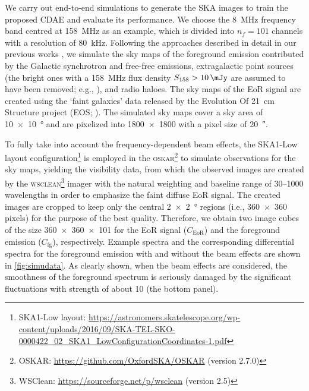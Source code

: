 \documentclass[fleqn,usenatbib]{mnras}
\newcommand{\R}[1]{\mathrm{#1}}
\begin{document}
We carry out end-to-end simulations to generate the SKA images to
train the proposed CDAE and evaluate its performance.
We choose the \SI{8}{\MHz} frequency band centred at \SI{158}{\MHz} as
an example, which is divided into $n_f = 101$ channels with a resolution
of \SI{80}{\kHz}.
Following the approaches described in detail in our previous works
\citep{wang2010,wang2013}, we simulate the sky maps of the foreground
emission contributed by the Galactic synchrotron and free-free
emissions, extragalactic point sources (the bright ones with a
\SI{158}{\MHz} flux density $S_{158} > \SI{10}{\mJy}$ are assumed to
have been removed; e.g., \citealt{liu2009ps}), and radio haloes.
The sky maps of the EoR signal are created using the `faint galaxies'
data released by the Evolution Of 21~cm Structure project
(EOS; \citealt{mesinger2016}).
The simulated sky maps cover a sky area of \SI{10 x 10}{\degree} and are
pixelized into \num{1800 x 1800} with a pixel size of \SI{20}{\arcsecond}.

To fully take into account the frequency-dependent beam effects,
the SKA1-Low layout configuration\footnote{\raggedright%
  SKA1-Low layout:
  \url{https://astronomers.skatelescope.org/wp-content/uploads/2016/09/SKA-TEL-SKO-0000422_02_SKA1_LowConfigurationCoordinates-1.pdf}}
is employed in the \textsc{oskar}\footnote{%
  OSKAR: \url{https://github.com/OxfordSKA/OSKAR} (version 2.7.0)}
\citep{mort2010} to simulate observations for the sky maps,
yielding the visibility data, from which the observed images are created
by the \textsc{wsclean}\footnote{%
  WSClean: \url{https://sourceforge.net/p/wsclean} (version 2.5)}
imager \citep{offringa2014} with the natural weighting and baseline
range of \numrange{30}{1000} wavelengths in order to emphasize the
faint diffuse EoR signal.
The created images are cropped to keep only the central
\SI{2 x 2}{\degree} regions (i.e., \num{360 x 360} pixels) for the
purpose of the best quality.
Therefore, we obtain two image cubes of the size \num{360 x 360 x 101}
for the EoR signal ($C_{\R{EoR}}$) and the foreground emission
($C_{\R{fg}}$), respectively.
Example spectra and the corresponding differential spectra for the
foreground emission with and without the beam effects are shown in
\autoref{fig:simudata}.
As clearly shown, when the beam effects are considered, the smoothness
of the foreground spectrum is seriously damaged by the significant
fluctuations with strength of about \SI{10}{\mK} (the bottom panel).
\end{document}
